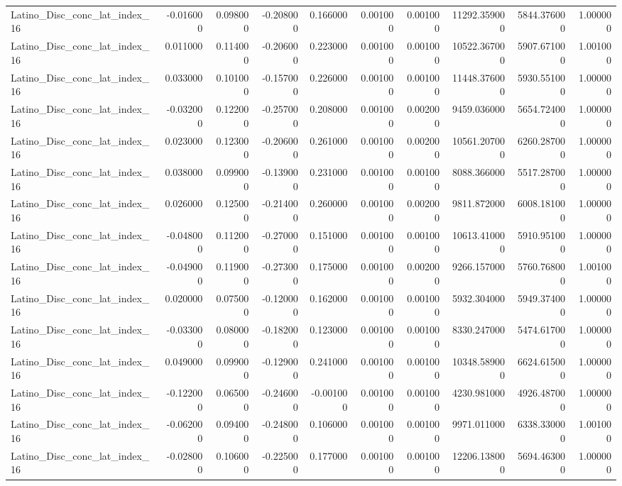 \begin{table}
\begin{tabular}{lrrrrrrrrr}
Latino_Disc_conc_lat_index_16 & -0.016000 & 0.098000 & -0.208000 & 0.166000 & 0.001000 & 0.001000 & 11292.359000 & 5844.376000 & 1.000000 \\
Latino_Disc_conc_lat_index_16 & 0.011000 & 0.114000 & -0.206000 & 0.223000 & 0.001000 & 0.001000 & 10522.367000 & 5907.671000 & 1.001000 \\
Latino_Disc_conc_lat_index_16 & 0.033000 & 0.101000 & -0.157000 & 0.226000 & 0.001000 & 0.001000 & 11448.376000 & 5930.551000 & 1.000000 \\
Latino_Disc_conc_lat_index_16 & -0.032000 & 0.122000 & -0.257000 & 0.208000 & 0.001000 & 0.002000 & 9459.036000 & 5654.724000 & 1.000000 \\
Latino_Disc_conc_lat_index_16 & 0.023000 & 0.123000 & -0.206000 & 0.261000 & 0.001000 & 0.002000 & 10561.207000 & 6260.287000 & 1.000000 \\
Latino_Disc_conc_lat_index_16 & 0.038000 & 0.099000 & -0.139000 & 0.231000 & 0.001000 & 0.001000 & 8088.366000 & 5517.287000 & 1.000000 \\
Latino_Disc_conc_lat_index_16 & 0.026000 & 0.125000 & -0.214000 & 0.260000 & 0.001000 & 0.002000 & 9811.872000 & 6008.181000 & 1.000000 \\
Latino_Disc_conc_lat_index_16 & -0.048000 & 0.112000 & -0.270000 & 0.151000 & 0.001000 & 0.001000 & 10613.410000 & 5910.951000 & 1.000000 \\
Latino_Disc_conc_lat_index_16 & -0.049000 & 0.119000 & -0.273000 & 0.175000 & 0.001000 & 0.002000 & 9266.157000 & 5760.768000 & 1.001000 \\
Latino_Disc_conc_lat_index_16 & 0.020000 & 0.075000 & -0.120000 & 0.162000 & 0.001000 & 0.001000 & 5932.304000 & 5949.374000 & 1.000000 \\
Latino_Disc_conc_lat_index_16 & -0.033000 & 0.080000 & -0.182000 & 0.123000 & 0.001000 & 0.001000 & 8330.247000 & 5474.617000 & 1.000000 \\
Latino_Disc_conc_lat_index_16 & 0.049000 & 0.099000 & -0.129000 & 0.241000 & 0.001000 & 0.001000 & 10348.589000 & 6624.615000 & 1.000000 \\
Latino_Disc_conc_lat_index_16 & -0.122000 & 0.065000 & -0.246000 & -0.001000 & 0.001000 & 0.001000 & 4230.981000 & 4926.487000 & 1.000000 \\
Latino_Disc_conc_lat_index_16 & -0.062000 & 0.094000 & -0.248000 & 0.106000 & 0.001000 & 0.001000 & 9971.011000 & 6338.330000 & 1.001000 \\
Latino_Disc_conc_lat_index_16 & -0.028000 & 0.106000 & -0.225000 & 0.177000 & 0.001000 & 0.001000 & 12206.138000 & 5694.463000 & 1.000000 \\

\end{tabular}
\end{table}
